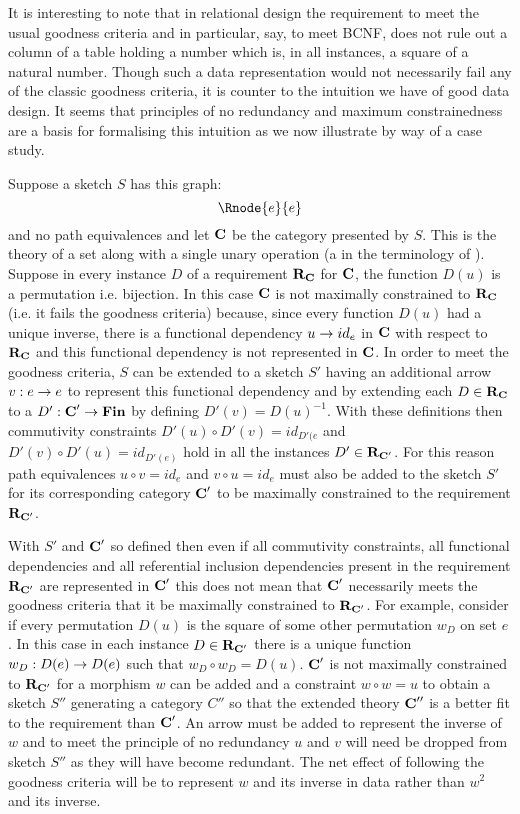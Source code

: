 It is interesting to note that in relational design the requirement to meet the usual goodness criteria and in particular, say, to meet  BCNF, 
does not rule out a column of a table   holding a number which is, in all instances, a square of a natural number. Though
such a data representation would not necessarily fail any of the classic goodness criteria, it is counter to the intuition we have of good data design. It seems that principles of no redundancy and maximum constrainedness are a basis for formalising this intuition as we now illustrate by way of a case study.

Suppose a sketch $S$ has  this graph:
$$
\Rnode{e}{e}
$$
and no path equivalences and let $\textbf{C}$ be the category presented by $S$. This is the theory of a
set along with a single unary operation (a  in the terminology of \cite{BarrandWells}). 
Suppose in every instance $D$ of a requirement $\textbf{R}_{\textbf{C}}$ for $\textbf{C}$, the function $D(u)$ is a permutation i.e. bijection. 
In this case  
$\textbf{C}$ is not maximally constrained to $\textbf{R}_{\textbf{C}}$ (i.e. it fails the goodness criteria) because, since every function $D(u)$ had a unique inverse, there is a functional dependency 
$u \rightarrow id_e$ in  $\textbf{C}$ with respect to $\textbf{R}_{\textbf{C}}$ and this functional dependency is not represented in $\textbf{C}$. 
In order to meet the goodness criteria, $S$ can be extended to a sketch $S'$ having an additional arrow $v:e \rightarrow e$ to represent this functional
dependency and by extending each $D \in \textbf{R}_{\textbf{C}}$ to a $D': \textbf{C}' \rightarrow \textbf{Fin}$ by defining $D'(v)=D(u)^{-1}$.
With these definitions then commutivity constraints $D'(u) \circ D'(v)=id_{D'(e}$ and $D'(v) \circ D'(u)=id_{D'(e)}$ hold
in all the instances $D' \in \textbf{R}_{\textbf{C}'}$. For this reason path equivalences $u \circ v=id_e$ and $v \circ u =id_e$
must also be added to the sketch $S'$ for its corresponding category $\textbf{C}'$  to be maximally constrained to the
requirement $\textbf{R}_{\textbf{C}'}$.

With $S'$ and $\textbf{C}'$ so defined then even if all commutivity constraints, all functional dependencies and all referential inclusion dependencies present in the requirement  $\textbf{R}_{\textbf{C}'}$ are represented in $\textbf{C}'$  this does not mean that
$\textbf{C}'$ necessarily meets the goodness criteria that it be maximally constrained to $\textbf{R}_{\textbf{C}'}$. For example, consider if every permutation 
$D(u)$ is the square of some other permutation $w_D$ on set $e$. In this case in each instance $D \in \textbf{R}_{\textbf{C}'}$ there is a unique
function $w_D: D(e) \rightarrow D(e)$ such that $w_D \circ w_D = D(u)$. 
$\textbf{C}'$ is not maximally constrained
to $\textbf{R}_{\textbf{C}'}$ for a morphism $w$ can be added and a constraint $w \circ w = u$ to obtain a sketch $S''$ generating 
a category $C''$ so that the extended theory $\textbf{C}''$ is a
better fit to the requirement than $\textbf{C}'$. An arrow must be added to represent the inverse of $w$ and to meet the principle of no redundancy $u$ and $v$ will need be dropped from sketch $S''$ as they will have become redundant.
The net effect of following the goodness criteria will be to represent $w$  and its inverse in data rather than $w^2$ and its inverse.

